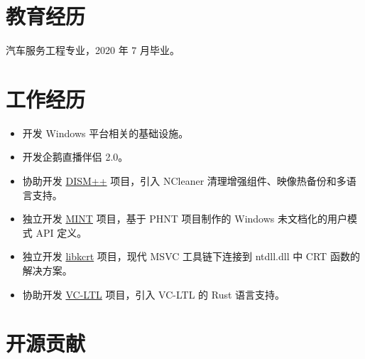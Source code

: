 \documentclass{resume}
\begin{document}
\renewcommand\headrulewidth{0pt}



\section{教育经历}

  汽车服务工程专业，2020 年 7 月毕业。

\section{工作经历}

\begin{itemize}
  \item 开发 Windows 平台相关的基础设施。
\end{itemize}

\begin{itemize}
  \item 开发企鹅直播伴侣 2.0。
\end{itemize}

\begin{itemize}
  \item 协助开发 \href{http://www.chuyu.me/zh-Hans/index.html}{DISM++} 项目，引入 NCleaner 清理增强组件、映像热备份和多语言支持。
  \item 独立开发 \href{https://github.com/Chuyu-Team/MINT}{MINT} 项目，基于 PHNT 项目制作的 Windows 未文档化的用户模式 API 定义。
  \item 独立开发 \href{https://github.com/Chuyu-Team/libkcrt}{libkcrt} 项目，现代 MSVC 工具链下连接到 ntdll.dll 中 CRT 函数的解决方案。
  \item 协助开发 \href{https://github.com/Chuyu-Team/VC-LTL5}{VC-LTL} 项目，引入 VC-LTL 的 Rust 语言支持。
\end{itemize}

\section{开源贡献}
\end{document}
